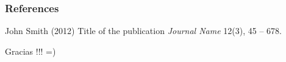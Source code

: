 \documentclass{beamer}
\begin{document}

\begin{frame}
\frametitle{References}
\footnotesize{
\begin{thebibliography}{99} %
 John Smith (2012)
\newblock Title of the publication
\newblock \emph{Journal Name} 12(3), 45 -- 678.
\end{thebibliography}
}
\end{frame}


\begin{frame}
\Huge{\centerline{Gracias !!! =)}}
\end{frame}

\end{document}
